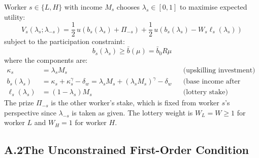 \documentclass[12pt,a4paper]{article}
\begin{document}
Worker $s \in \{L, H\}$ with income $M_s$ chooses $\lambda_s \in [0,1]$
to maximise expected utility:
\begin{equation}
  V_s(\lambda_s;\lambda_{-s})
  = \frac{1}{2}\,u\!\left(b_s(\lambda_s) + \Pi_{-s}\right)
  + \frac{1}{2}\,u\!\left(b_s(\lambda_s) - W_s\ell_s(\lambda_s)\right)
  \tag{A.1}
  \label{eq:Vs_full}
\end{equation}
subject to the participation constraint:
\begin{equation}
  b_s(\lambda_s) \geq \bar{b}(\mu) = \bar{b}_0 R\mu
  \tag{A.2}
  \label{eq:pc_app}
\end{equation}
where the components are:
\begin{align}
  \kappa_s &= \lambda_s M_s
  && \text{(upskilling investment)} \tag{A.3} \\
  b_s(\lambda_s) &= \kappa_s + \kappa_s^\gamma - \delta_w
  = \lambda_s M_s + (\lambda_s M_s)^\gamma - \delta_w
  && \text{(base income after upskilling)} \tag{A.4} \\
  \ell_s(\lambda_s) &= (1-\lambda_s)M_s
  && \text{(lottery stake)} \tag{A.5}
\end{align}
The prize $\Pi_{-s}$ is the other worker's stake, which is fixed from
worker $s$'s perspective since $\lambda_{-s}$ is taken as given. The
lottery weight is $W_L = W \geq 1$ for worker $L$ and $W_H = 1$ for
worker $H$.

\subsection*{A.2\quad The Unconstrained First-Order Condition}
\end{document}
